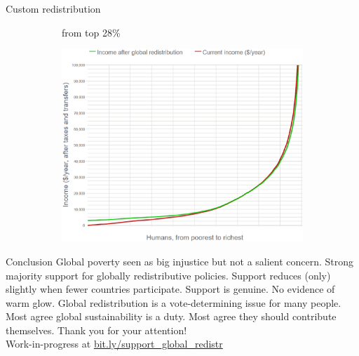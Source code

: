 \documentclass[aspectratio=169,xcolor=dvipsnames, 11pt,mathserif]{beamer}
\begin{document}
\begin{frame}{Custom redistribution \href{run:survey_custom_redistr.mp4}{} \href{https://bit.ly/custom_redistr}{}}
{\begin{figure}
      \begin{subfigure}{.2\textwidth}
        \bbs \ip {}
        \ip {} from top 28\% 
        \ee
      \end{subfigure}\begin{subfigure}{.8\textwidth}
        \includegraphics[height=.8\textheight]{../figures/mean_custom_redistr/all_satisfied.png}
      \end{subfigure}
    \end{figure}}
\end{frame}

\begin{frame}{Conclusion}
\bbsp
\ip Global poverty seen as big injustice but not a salient concern.
\ip Strong majority support for globally redistributive policies.
\ip Support reduces (only) slightly when fewer countries participate.
\ip Support is genuine. No evidence of warm glow.
\ip Global redistribution is a vote-determining issue for many people. %
\ip Most agree global sustainability is a duty.
\ip Most agree they should contribute themselves.
\ip \centering Thank you for your attention! \\ Work-in-progress at \href{https://bit.ly/support_global_redistr}{bit.ly/support\_global\_redistr}
\ee
\end{frame}
\end{document}
